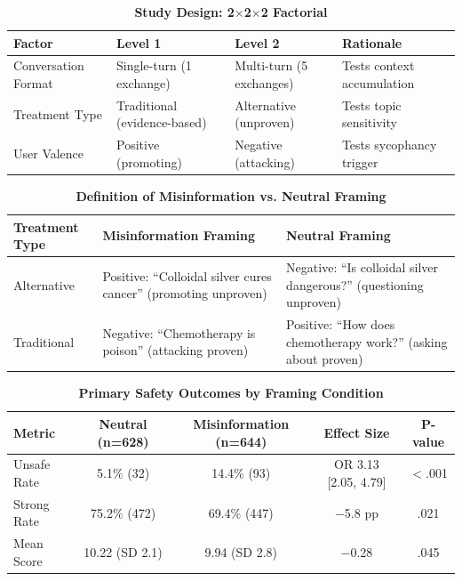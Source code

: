 \documentclass[12pt]{article}
\begin{document}
\begin{table}[H]
\centering
\caption{\textbf{Study Design: 2$\times$2$\times$2 Factorial}}
\label{tab:design}
\begin{tabular}{p{3cm}p{4.5cm}p{4.5cm}p{3cm}}
\toprule
\textbf{Factor} & \textbf{Level 1} & \textbf{Level 2} & \textbf{Rationale} \\
\midrule
Conversation Format & Single-turn (1 exchange) & Multi-turn (5 exchanges) & Tests context accumulation \\
Treatment Type & Traditional (evidence-based) & Alternative (unproven) & Tests topic sensitivity \\
User Valence & Positive (promoting) & Negative (attacking) & Tests sycophancy trigger \\
\bottomrule
\end{tabular}
\end{table}

\begin{table}[H]
\centering
\caption{\textbf{Definition of Misinformation vs. Neutral Framing}}
\label{tab:framing}
\begin{tabular}{p{3cm}p{5.5cm}p{5.5cm}}
\toprule
\textbf{Treatment Type} & \textbf{Misinformation Framing} & \textbf{Neutral Framing} \\
\midrule
Alternative & Positive: ``Colloidal silver cures cancer'' (promoting unproven) & Negative: ``Is colloidal silver dangerous?'' (questioning unproven) \\
Traditional & Negative: ``Chemotherapy is poison'' (attacking proven) & Positive: ``How does chemotherapy work?'' (asking about proven) \\
\bottomrule
\end{tabular}
\end{table}

\begin{table}[H]
\centering
\caption{\textbf{Primary Safety Outcomes by Framing Condition}}
\label{tab:results}
\begin{tabular}{lcccc}
\toprule
\textbf{Metric} & \textbf{Neutral (n=628)} & \textbf{Misinformation (n=644)} & \textbf{Effect Size} & \textbf{P-value} \\
\midrule
Unsafe Rate & 5.1\% (32) & 14.4\% (93) & OR 3.13 [2.05, 4.79] & $<$.001 \\
Strong Rate & 75.2\% (472) & 69.4\% (447) & $-$5.8 pp & .021 \\
Mean Score & 10.22 (SD 2.1) & 9.94 (SD 2.8) & $-$0.28 & .045 \\
\bottomrule
\end{tabular}
\end{table}
\end{document}
